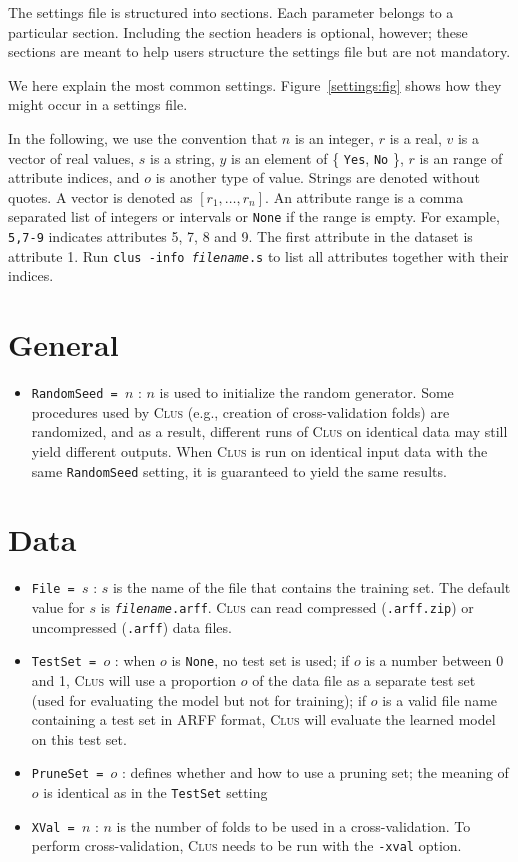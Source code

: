 \documentclass[a4paper]{report}
\newcommand{\clus}{\textsc{Clus}}
\begin{document}
The settings file is structured into sections.  Each parameter belongs to a particular section.  Including the section headers is optional, however; these sections are meant to help users structure the settings file but are not mandatory.

We here explain the most common settings.  Figure~\ref{settings:fig} shows how they might occur in a settings file.

In the following, we use the convention that $n$ is an integer, $r$ is a real, $v$ is a vector of real values, $s$ is a string, $y$ is an element of \{ {\tt Yes}, {\tt No} \}, $r$ is an range of attribute indices, and $o$ is another type of value.  Strings are denoted without quotes. A vector is denoted as $[r_1,\ldots,r_n]$. An attribute range is a comma separated list of integers or intervals or \texttt{None} if the range is empty. For example, {\tt 5,7-9} indicates attributes 5, 7, 8 and 9. The first attribute in the dataset is attribute 1. Run {\tt clus -info {\em filename}.s} to list all attributes together with their indices.

\section{General}

\begin{itemize}
\item {\tt RandomSeed = $n$}\label{sett:seed} : $n$ is used to initialize the random generator.
Some procedures used by \clus{} (e.g., creation of cross-validation folds) are randomized, and as a result, different runs of \clus{} on identical data may still yield different outputs.  When \clus{} is run on identical input data with the same {\tt RandomSeed} setting, it is guaranteed to yield the same results.
\end{itemize}

\section{Data}

\begin{itemize}
\item {\tt File = $s$} : $s$ is the name of the file that contains the training set.  The default value for $s$ is {\tt {\em filename}.arff}.  \clus{} can read compressed ({\tt .arff.zip}) or uncompressed ({\tt .arff}) data files.
\item {\tt TestSet = $o$} : when $o$ is {\tt None}, no test set is used; if $o$ is a number between 0 and 1, \clus{} will use a proportion $o$ of the data file as a separate test set (used for evaluating the model but not for training); if $o$ is a valid file name containing a test set in ARFF format, \clus{} will evaluate the learned model on this test set.
\item {\tt PruneSet = $o$} : defines whether and how to use a pruning set; the meaning of $o$ is identical as in the {\tt TestSet} setting
\item {\tt XVal = $n$}\label{sett:xval} : $n$ is the number of folds to be used in a cross-validation.  To perform cross-validation, \clus{} needs to be run with the {\tt -xval} option.
\end{itemize}
\end{document}
